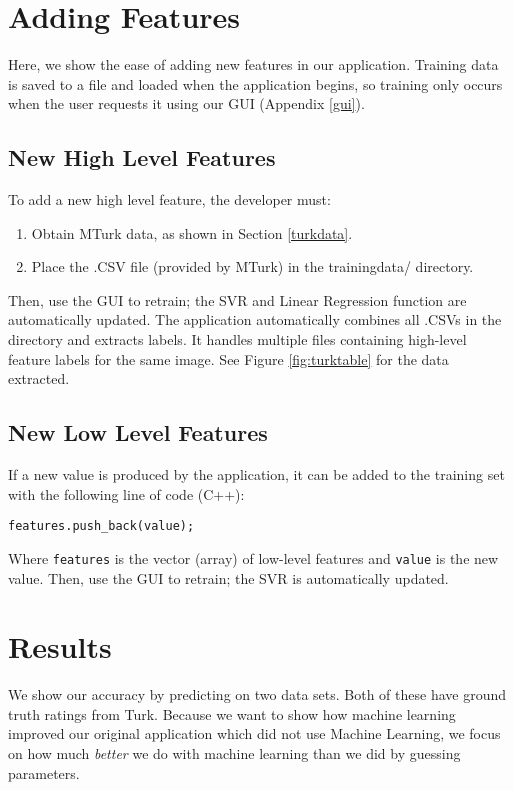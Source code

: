 \documentclass[11pt,letter]{article}
\begin{document}
\section{Adding Features}
Here, we show the ease of adding new features in our application. Training data is saved to a file and loaded when the application begins, so training only occurs when the user requests it using our GUI (Appendix \ref{gui}).

\subsection{New High Level Features}
To add a new high level feature, the developer must:

\begin{enumerate}
\item Obtain MTurk data, as shown in Section \ref{turkdata}.
\item Place the .CSV file (provided by MTurk) in the trainingdata/ directory.
\end{enumerate}

Then, use the GUI to retrain; the SVR and Linear Regression function are automatically updated. The application automatically combines all .CSVs in the directory and extracts labels. It handles multiple files containing high-level feature labels for the same image. See Figure \ref{fig:turktable} for the data extracted.

\subsection{New Low Level Features}
If a new value is produced by the application, it can be added to the training set with the following line of code (C++):

\texttt{features.push\_back(value);}

Where \texttt{features} is the vector (array) of low-level features and \texttt{value} is the new value. Then, use the GUI to retrain; the SVR is automatically updated.

\section{Results}
We show our accuracy by predicting on two data sets. Both of these have ground truth ratings from Turk. Because we want to show how machine learning improved our original application\cite{imagesorter} which did not use Machine Learning, we focus on how much \textit{better} we do with machine learning than we did by guessing parameters.
\end{document}
